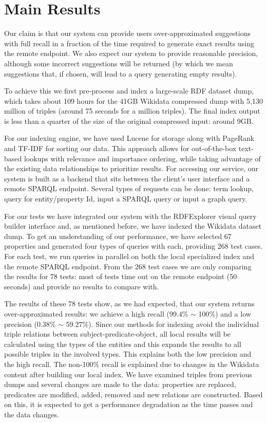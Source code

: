 \section{Main Results}

Our claim is that our system can provide users over-approximated suggestions with full recall in a fraction of the time required to
generate exact results using the remote endpoint. We also expect our system to provide reasonable precision, although some incorrect suggestions will be returned (by which we mean suggestions that, if chosen, will lead to a query generating empty results).

To achieve this we first pre-process and index a large-scale RDF dataset dump, which takes about 109 hours for the 41GB Wikidata compressed dump with 5,130 million of triples (around 75 seconds for a million triples). The final index output is less than a quarter of the size of the original compressed input: around 9GB. 

For our indexing engine, we have used Lucene for storage along with PageRank and TF-IDF for sorting our data. This approach allows for out-of-the-box text-based lookups with relevance and importance ordering, while taking advantage of the existing data relationships to prioritize results. For accessing our service, our system is built as a backend that sits between the client's user interface and a remote SPARQL endpoint. Several types of requests can be done: term lookup, query for entity/property Id, input a SPARQL query or input a graph query.

For our tests we have integrated our system with the RDFExplorer visual query builder interface and, as mentioned before, we have indexed the Wikidata dataset dump. To get an understanding of our performance, we have selected 67 properties and generated four types of queries with each, providing 268 test cases. For each test, we run queries in parallel on both the local specialized index and the remote SPARQL endpoint. From the 268 test cases we are only comparing the results for 78 tests: most of tests time out on the remote endpoint (50 seconds) and provide no results to compare with. 

The results of these 78 tests show, as we had expected, that our system returns over-approximated results: we achieve a high recall (99.4\% $\sim$ 100\%) and a low precision (0.38\% $\sim$ 59.27\%). Since our methods for indexing avoid the individual triple relations between subject-predicate-object, all local results will be calculated using the types of the entities and this expands the results to all possible triples in the involved types. This explains both the low precision and the high recall. The non-100\% recall is explained due to changes in the Wikidata content after building our local index. We have examined triples from previous dumps and several changes are made to the data: properties are replaced, predicates are modified, added, removed and new relations are constructed. Based on this, it is expected to get a performance degradation as the time passes and the data changes.


